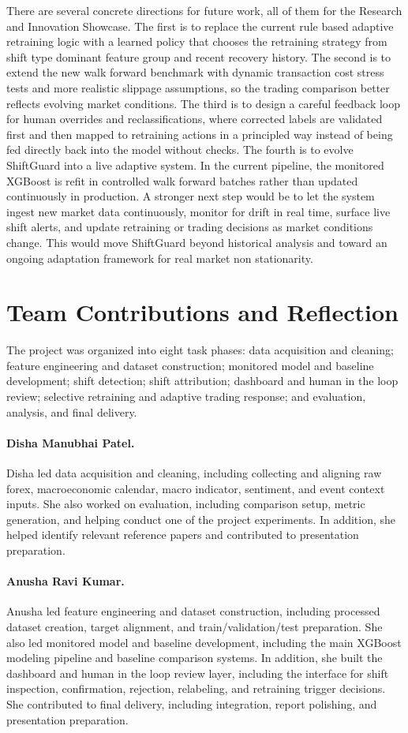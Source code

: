 \documentclass[11pt]{article}
\begin{document}
There are several concrete directions for future work, all of them for the Research and Innovation Showcase. The first is to replace the current rule based adaptive retraining logic with a learned policy that chooses the retraining strategy from shift type dominant feature group and recent recovery history. The second is to extend the new walk forward benchmark with dynamic transaction cost stress tests and more realistic slippage assumptions, so the trading comparison better reflects evolving market conditions. The third is to design a careful feedback loop for human overrides and reclassifications, where corrected labels are validated first and then mapped to retraining actions in a principled way instead of being fed directly back into the model without checks. The fourth is to evolve ShiftGuard into a live adaptive system. In the current pipeline, the monitored XGBoost is refit in controlled walk forward batches rather than updated continuously in production. A stronger next step would be to let the system ingest new market data continuously, monitor for drift in real time, surface live shift alerts, and update retraining or trading decisions as market conditions change. This would move ShiftGuard beyond historical analysis and toward an ongoing adaptation framework for real market non stationarity.

\section{Team Contributions and Reflection}
The project was organized into eight task phases: data acquisition and cleaning; feature engineering and dataset construction; monitored model and baseline development; shift detection; shift attribution; dashboard and human in the loop review; selective retraining and adaptive trading response; and evaluation, analysis, and final delivery.

\paragraph{Disha Manubhai Patel.}
Disha led data acquisition and cleaning, including collecting and aligning raw forex, macroeconomic calendar, macro indicator, sentiment, and event context inputs. She also worked on evaluation, including comparison setup, metric generation, and helping conduct one of the project experiments. In addition, she helped identify relevant reference papers and contributed to presentation preparation.

\paragraph{Anusha Ravi Kumar.}
Anusha led feature engineering and dataset construction, including processed dataset creation, target alignment, and train/validation/test preparation. She also led monitored model and baseline development, including the main XGBoost modeling pipeline and baseline comparison systems. In addition, she built the dashboard and human in the loop review layer, including the interface for shift inspection, confirmation, rejection, relabeling, and retraining trigger decisions. She contributed to final delivery, including integration, report polishing, and presentation preparation.
\end{document}

